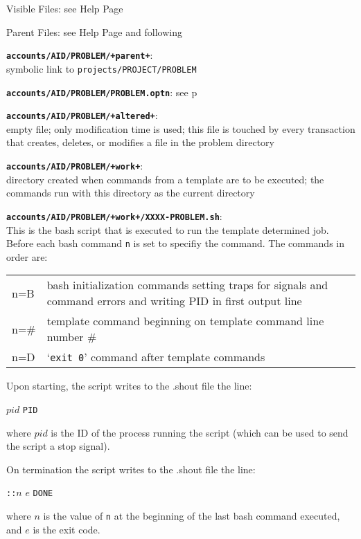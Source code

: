 \documentclass[12pt]{article}
\newenvironment{indpar}[1][0.4in]%
	{\begin{list}{}%
		     {\setlength{\itemsep}{0in}%
		      \setlength{\topsep}{0in}%
		      \setlength{\parsep}{1ex}%
		      \setlength{\labelwidth}{#1}%
		      \setlength{\leftmargin}{#1}%
		      \addtolength{\leftmargin}{\labelsep}}%
	 \item}%
	{\end{list}}
\newenvironment{itemlist}[1][0.2in]%
	{\begin{list}{}{\setlength{\labelwidth}{#1}%
		        \setlength{\leftmargin}{\labelwidth}%
		        \addtolength{\leftmargin}{+0.2in}%
		        \addtolength{\linewidth}{-\labelwidth}%
		        \addtolength{\linewidth}{-0.2in}%
		        \renewcommand{\makelabel}[1]{##1\hfill}}
	 \raggedright}%
	{\end{list}}
\newcommand{\TT}[1]{{\tt \bfseries #1}}
\newcommand{\pagref}[1]{p\pageref{#1}}
\begin{document}
\begin{indpar}
\begin{itemlist}
\item[Visible Files:] see Help Page \\
\item[Parent Files:] see Help Page and following \\
\item[\TT{accounts/AID/PROBLEM/+parent+}:]~\\
    symbolic link to {\tt projects/PROJECT/PROBLEM} \\
\item[\TT{accounts/AID/PROBLEM/PROBLEM.optn}:] see \pagref{PROBLEM.OPTN} \\
\item[\TT{accounts/AID/PROBLEM/+altered+}:]~
\label{PROBLEM/ALTERED} \\
    empty file; only modification time is used;
    this file is touched by every transaction that
    creates, deletes, or modifies a file in the problem directory
\item[\TT{accounts/AID/PROBLEM/+work+}:]~
\label{PROBLEM/WORK} \\
    directory created when commands from a template are to be
    executed; the commands run with this directory as the current
    directory
\item[\TT{accounts/AID/PROBLEM/+work+/XXXX-PROBLEM.sh}:]~ \\
This is the bash script that is executed to run the template
determined job.  Before each bash command {\tt n} is set to
specifiy the command.  The commands in order are:
\begin{center}
\begin{tabular}{lp{4.0in}}
n=B & bash initialization commands setting traps for signals
      and command errors and writing PID in first output line \\
n=\# & template command beginning on template command line number \# \\
n=D  & `{\tt exit 0}' command after template commands \\
\end{tabular}
\end{center}
Upon starting, the script writes to the .shout file the line:
\begin{center}
$pid$ {\tt PID}
\end{center}
where $pid$ is the ID of the process running the script (which
can be used to send the script a stop signal).

On termination the script writes to the .shout file the line:
\begin{center}
{\tt ::}$n$ $e$ {\tt DONE}
\end{center}
where $n$ is the value of {\tt n} at the beginning of the
last bash command executed, and $e$ is the exit code.


\end{itemlist}
\end{indpar}
\end{document}
